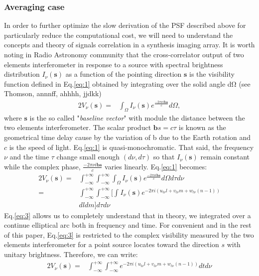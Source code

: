 \subsubsection{Averaging case}
In order to further optimize the slow derivation of the PSF described above for particularly reduce the computational
cost, we will need to understand the concepts and theory of signals correlation in a synthesis imaging array.
It is worth noting in Radio Astronomy community that the cross-correlator output of two elements interferometer
in response to a source with spectral brightness distribution $I_{\nu}(\mathbf{s})$ as a function of the pointing direction $\mathbf{s}$ 
is the visibility function defined in Eq.\ref{eq:1} obtained by integrating
over the solid angle dΩ (see Thomson, annnff, ahhhh, jjdkk)
\begin{alignat}{2}
V_{\nu}(\mathbf{s}) =& \int_{\Omega}I_{\nu}(\mathbf{s})e^{\frac{-2\pi\nu i \mathbf{b}\mathbf{s}}{c}}d\Omega, \label{eq:1}
\end{alignat}
where $\mathbf{s}$  is the so called "\textit{baseline vector}" with module the distance between the two elements
interferometer. The scalar product $\mathbf{b}{s}=c\tau$ is known as the geometrical time
delay cause by the variation of b due to the Earth rotation and $c$ is the speed of light. Eq.\ref{eq:1} is quasi-monochromatic.
That said, the frequency $\nu$ and the time $\tau$ change small  enough $(d\nu, d\tau)$ so that $I_{\nu}(\mathbf{s})$
remain constant while the complex phase, $\frac{-2\pi\nu i \mathbf{b}\mathbf{s}}{c}$ varies linearly.   Eq.\ref{eq:1} becomes:
\begin{alignat}{2}
V_{\nu}(\mathbf{s}) =& \int_{-\infty}^{+\infty}\int_{-\infty}^{+\infty}\int_{\Omega}I_{\nu}(\mathbf{s})e^{\frac{-2\pi\nu i \mathbf{b}\mathbf{s}}{c}}d\Omega d\tau d\nu \label{eq:2}\\	    
		    =& \int_{-\infty}^{+\infty}\int_{-\infty}^{+\infty}\Big[\int_{}I_{\nu}(\mathbf{s})e^{-2\pi i (u_{t\nu}l+v_{t\nu}m+w_{t\nu}(n-1))}\\
		     &dldm\Big] d\tau d\nu\label{eq:3}
\end{alignat}
Eq.\ref{eq:3} allows us to completely understand that in theory, we integrated over a continue elliptical arc both
in frequency and time. For convenient and in the rest of this paper, Eq.\ref{eq:3} is restricted to the complex visibility
measured by the two elements interferometer for a point source locates toward the direction $s$ with unitary brightness. 
Therefore, we can write:
\begin{alignat}{2}
V_{\nu}(\mathbf{s})  =& \int_{-\infty}^{+\infty}\int_{-\infty}^{+\infty}e^{-2\pi i (u_{t\nu}l+v_{t\nu}m+w_{t\nu}(n-1))}dt d\nu\label{eq:4}
\end{alignat}
